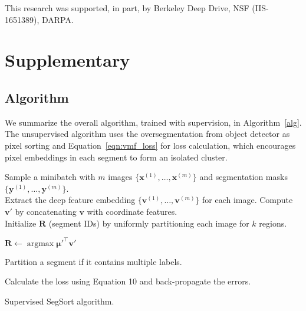 \documentclass[10pt,twocolumn,letterpaper]{article}
\DeclareMathOperator*{\argmax}{argmax}
\begin{document}
\vspace{-6 pt}
 This research was supported, in part, by Berkeley Deep Drive, NSF (IIS-1651389), DARPA.

 
\newpage

{\small


}

\clearpage



\section{Supplementary}

\subsection{Algorithm}
\label{sec:alg}

We summarize the overall algorithm, trained with supervision, in Algorithm~\ref{alg}. The unsupervised algorithm uses the oversegmentation from object detector as pixel sorting and Equation~\ref{eqn:vmf_loss} for loss calculation, which encourages pixel embeddings in each segment to form an isolated cluster.


\begin{algorithm}[b]
\label{alg}
\SetAlgoLined
\SetNoFillComment
{} {
    Sample a minibatch with $m$ images $\{ \pmb{x}^{(1)}, \dots, \pmb{x}^{(m)} \}$ and segmentation masks $\{ \pmb{y}^{(1)}, \dots, \pmb{y}^{(m)} \}$. \\
    Extract the deep feature embedding $\{ \pmb{v}^{(1)}, \dots, \pmb{v}^{(m)} \}$ for each image.
    Compute $\pmb{v}'$ by concatenating $\pmb{v}$ with coordinate features. \\
    Initialize $\pmb{R}$ (segment IDs) by uniformly partitioning each image for $k$ regions.
    
     {
    
    $\pmb{R} \leftarrow \argmax \pmb{\mu}'^\top \pmb{v}'$
    }
    
    Partition a segment if it contains multiple labels.
    
    
    Calculate the loss using Equation 10 and back-propagate the errors.
    }
\caption{Supervised SegSort algorithm.}
\end{algorithm}
\end{document}
